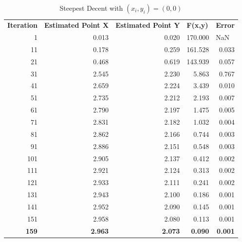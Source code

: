 \documentclass[12pt]{article}
\begin{document}
\begin{table}[h!]
  \centering
  \caption{Steepest Decent with $(x_i,y_i) = (0,0)$}
    \begin{tabular}{rrrrr}
    \multicolumn{1}{l}{\textbf{Iteration}} & \multicolumn{1}{l}{\textbf{Estimated Point X}} & \multicolumn{1}{l}{\textbf{Estimated Point Y}} & \multicolumn{1}{l}{\textbf{F(x,y)}} & \multicolumn{1}{l}{\textbf{Error}} \\
    1     & 0.013 & 0.020 & 170.000 & \multicolumn{1}{l}{NaN} \\
    11    & 0.178 & 0.259 & 161.528 & 0.033 \\
    21    & 0.468 & 0.619 & 143.939 & 0.057 \\
    31    & 2.545 & 2.230 & 5.863 & 0.767 \\
    41    & 2.659 & 2.224 & 3.439 & 0.010 \\
    51    & 2.735 & 2.212 & 2.193 & 0.007 \\
    61    & 2.790 & 2.197 & 1.475 & 0.005 \\
    71    & 2.831 & 2.182 & 1.032 & 0.004 \\
    81    & 2.862 & 2.166 & 0.744 & 0.003 \\
    91    & 2.886 & 2.151 & 0.548 & 0.003 \\
    101   & 2.905 & 2.137 & 0.412 & 0.002 \\
    111   & 2.921 & 2.124 & 0.313 & 0.002 \\
    121   & 2.933 & 2.111 & 0.241 & 0.002 \\
    131   & 2.943 & 2.100 & 0.186 & 0.001 \\
    141   & 2.952 & 2.090 & 0.145 & 0.001 \\
    151   & 2.958 & 2.080 & 0.113 & 0.001 \\
    \textbf{159} & \textbf{2.963} & \textbf{2.073} & \textbf{0.090} & \textbf{0.001} \\
    \end{tabular}%
  \label{tab:SDM_guess1}%
\end{table}%
\end{document}
